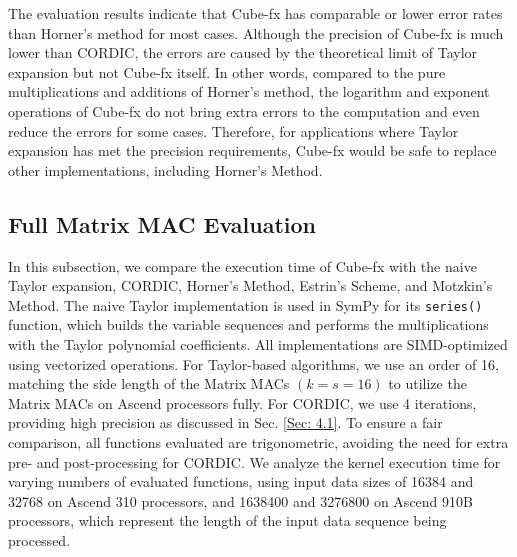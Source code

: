 The evaluation results indicate that Cube-fx has comparable or lower error rates than Horner's method for most cases. Although the precision of Cube-fx is much lower than CORDIC, the errors are caused by the theoretical limit of Taylor expansion but not Cube-fx itself. In other words, compared to the pure multiplications and additions of Horner's method, the logarithm and exponent operations of Cube-fx do not bring extra errors to the computation and even reduce the errors for some cases. Therefore, for applications where Taylor expansion has met the precision requirements, Cube-fx would be safe to replace other implementations, including Horner's Method.

\subsection{Full Matrix MAC Evaluation \label{Sec: 4.2}}

In this subsection, we compare the execution time of Cube-fx with the naive Taylor expansion, CORDIC, Horner's Method, Estrin's Scheme, and Motzkin's Method. The naive Taylor implementation is used in SymPy \cite{10.7717/peerj-cs.103} for its \verb|series()| function, which builds the variable sequences and performs the multiplications with the Taylor polynomial coefficients. All implementations are SIMD-optimized using vectorized operations. For Taylor-based algorithms, we use an order of 16, matching the side length of the Matrix MACs $(k = s = 16)$ to utilize the Matrix MACs on Ascend processors fully. For CORDIC, we use 4 iterations, providing high precision as discussed in Sec. \ref{Sec: 4.1}. To ensure a fair comparison, all functions evaluated are trigonometric, avoiding the need for extra pre- and post-processing for CORDIC. We analyze the kernel execution time for varying numbers of evaluated functions, using input data sizes of 16384 and 32768 on Ascend 310 processors, and 1638400 and 3276800 on Ascend 910B processors, which represent the length of the input data sequence being processed.

